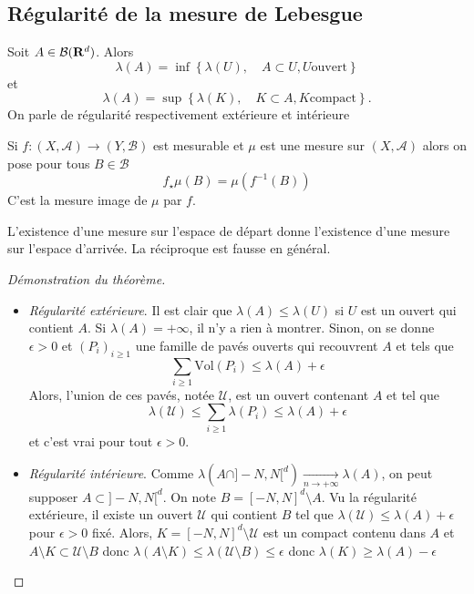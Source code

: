 \subsection{Régularité de la mesure de Lebesgue}

\begin{thm}
    Soit $A \in  \mathcal  B(\mathbf R^d)$. Alors \[
        \lambda(A)=\inf \left\{ \lambda(U), \quad  A\subset U, U \text{ouvert} \right\} 
    \]
    et \[
        \lambda(A)= \sup \left\{ \lambda(K), \quad  K\subset A, K\text{compact} \right\}.
    \]
    On parle de régularité respectivement extérieure et intérieure
\end{thm}

\begin{dfn}
    Si $f:(X, \mathcal  A)\longrightarrow (Y, \mathcal  B)$ est mesurable et $\mu$ est une mesure sur  $(X, \mathcal  A)$ alors on pose pour tous $B \in  \mathcal  B$ \[
        f_\star \mu(B)=\mu(f^{-1} (B))
    \]
    C'est la mesure image de $\mu$ par  $f$.
\end{dfn}

\begin{rem}
L'existence d'une mesure sur l'espace de départ donne l'existence d'une mesure sur l'espace d'arrivée. La réciproque est fausse en général.
\end{rem}

\begin{proof}[Démonstration du théorème]
~
\begin{itemize}
    \item \emph{Régularité extérieure}. Il est clair que $\lambda(A)\leq \lambda(U)$ si $U$ est un ouvert qui contient  $A$. Si $\lambda(A)=+\infty$, il n'y a rien à montrer. Sinon, on se donne  $ \epsilon>0$ et $(P_i)_{i\geq 1}$ une famille de pavés ouverts qui recouvrent $A$ et tels que  \[
            \sum_{i\geq 1} \mathrm{Vol}(P_i) \leq \lambda(A)+\epsilon
    \] 
    Alors, l'union de ces pavés, notée $\mathcal  U$, est un ouvert contenant $A$ et tel que  \[
        \lambda(\mathcal  U)\leq \sum_{i\geq 1}\lambda(P_i)\leq \lambda(A)+\epsilon
    \] 
    et c'est vrai pour tout $ \epsilon>0$.
\item \emph{Régularité intérieure}. Comme $\lambda(A\cap ]-N, N[^d) \xrightarrow[n\to+\infty]{}\lambda(A)$, on peut supposer $A\subset ]-N, N[^d$. On note  $B=[-N, N]^d \setminus  A$. Vu la régularité extérieure, il existe un ouvert $\mathcal  U$ qui contient $B$ tel que  $\lambda(\mathcal  U)\leq \lambda(A)+\epsilon$ pour $\epsilon>0$ fixé. Alors, $K=[-N, N]^d \setminus  \mathcal  U$ est un compact contenu dans $A$ et  $A \setminus  K\subset \mathcal U \setminus  B$ donc $\lambda (A \setminus  K)\leq  \lambda (\mathcal  U \setminus  B)\leq  \epsilon$ donc $\lambda(K)\geq \lambda(A)-\epsilon$
\end{itemize}
\end{proof}

